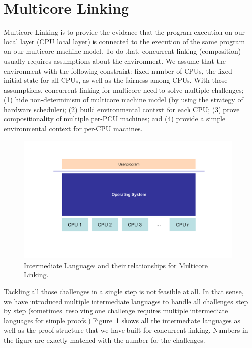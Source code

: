 \section{Multicore Linking}
\label{chapter:linking:sec:multicore-linking}

Multicore Linking is to provide the evidence that the program execution on
our local layer (CPU local layer) is connected to the execution of the same program on our multicore machine model. 
To do that, concurrent linking (composition) usually requires assumptions about the environment. 
We assume that the environment with the following constraint:
fixed number of CPUs, the fixed initial state for all CPUs,
as well as the fairness among CPUs.
With those assumptions, 
concurrent linking for multicore need to solve multiple challenges;
(1) hide non-determinism of multicore machine model (by using the strategy of hardware scheduler);
(2) build environmental context for each CPU;
(3) prove compositionality of multiple per-PCU machines;
and (4) provide a simple environmental context for per-CPU machines. 
\begin{figure}
\begin{center}
\includegraphics[width=\textwidth, page=16]{figs/conlink/concurrent_linking}
\end{center}
\caption{Intermediate Languages and their relationships for Multicore Linking.}
\label{fig:chapter:conlink:intermediate-languages-and-their-relationsihps-for-multicore-linking}
\end{figure}
Tackling all those challenges in a single step is not feasible at all. 
In that sense, 
we have introduced multiple intermediate languages 
to handle all challenges step by step (sometimes,
resolving one challenge requires multiple intermediate languages
for simple proofs.) 
Figure~\ref{fig:chapter:conlink:intermediate-languages-and-their-relationsihps-for-multicore-linking} shows
all the intermediate languages as well as the proof structure that we have built for concurrent linking. 
Numbers in the figure are exactly matched with the number for the challenges. 

